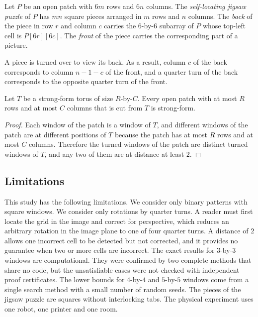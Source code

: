 \documentclass{lipics-v2021}
\begin{document}
\begin{definition} \label{def:jigsaw}
Let $P$ be an open patch with $6m$ rows and $6n$ columns.
The \emph{self-locating jigsaw puzzle} of $P$ has $mn$ square pieces arranged in $m$ rows and $n$ columns.
The \emph{back} of the piece in row $r$ and column $c$ carries the $6$-by-$6$ subarray of $P$ whose top-left cell is $P[6r][6c]$.
The \emph{front} of the piece carries the corresponding part of a picture.
\end{definition}

A piece is turned over to view its back.
As a result, column $c$ of the back corresponds to column $n-1-c$ of the front, and a quarter turn of the back corresponds to the opposite quarter turn of the front.

\begin{lemma} \label{lem:cut}
Let $T$ be a strong-form torus of size $R$-by-$C$.
Every open patch with at most $R$ rows and at most $C$ columns that is cut from $T$ is strong-form.
\end{lemma}

\begin{proof}
Each window of the patch is a window of $T$, and different windows of the patch are at different positions of $T$ because the patch has at most $R$ rows and at most $C$ columns.
Therefore the turned windows of the patch are distinct turned windows of $T$, and any two of them are at distance at least $2$.
\end{proof}

\subsection{Limitations}
\label{sec:preliminaries_limitations}

This study has the following limitations.
We consider only binary patterns with square windows.
We consider only rotations by quarter turns.
A reader must first locate the grid in the image and correct for perspective, which reduces an arbitrary rotation in the image plane to one of four quarter turns.
A distance of $2$ allows one incorrect cell to be detected but not corrected, and it provides no guarantee when two or more cells are incorrect.
The exact results for $3$-by-$3$ windows are computational.
They were confirmed by two complete methods that share no code, but the unsatisfiable cases were not checked with independent proof certificates.
The lower bounds for $4$-by-$4$ and $5$-by-$5$ windows come from a single search method with a small number of random seeds.
The pieces of the jigsaw puzzle are squares without interlocking tabs.
The physical experiment uses one robot, one printer and one room.
\end{document}
